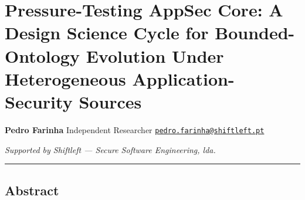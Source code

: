 \documentclass[
]{article}
\author{}
\date{}
\begin{document}
\section{Pressure-Testing AppSec Core: A Design Science Cycle for
Bounded-Ontology Evolution Under Heterogeneous Application-Security
Sources}\label{pressure-testing-appsec-core-a-design-science-cycle-for-bounded-ontology-evolution-under-heterogeneous-application-security-sources}

\textbf{Pedro Farinha} Independent Researcher
\href{mailto:pedro.farinha@shiftleft.pt}{\nolinkurl{pedro.farinha@shiftleft.pt}}

\emph{Supported by Shiftleft --- Secure Software Engineering, lda.}

\begin{center}\rule{0.5\linewidth}{0.5pt}\end{center}

\subsection{Abstract}\label{abstract}
\end{document}
